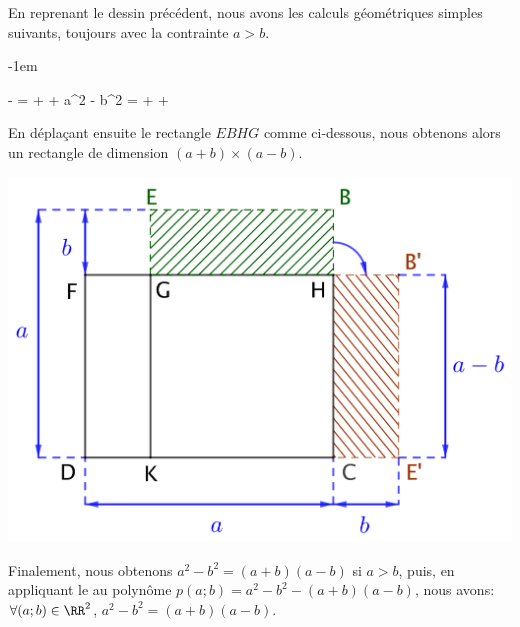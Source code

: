 \begin{example}
	En reprenant le dessin précédent, nous avons les calculs géométriques simples suivants, toujours avec la contrainte $a > b$.

	\smallskip
	\leavevmode\kern-1em%
	\begin{stepcalc}[style=ar*, ope={\iff}]
    	 -  =  +  + 
	\explnext{}
    	a^2 - b^2 =  +  + 
	\end{stepcalc}
	\smallskip

	En déplaçant ensuite le rectangle $EBHG$ comme ci-dessous, nous obtenons alors un rectangle de dimension $(a+b) \times (a-b)$. 

	\begin{center}
		\includegraphics[scale = .7]{a^2-b^2.png}
	\end{center}

	Finalement, nous obtenons $a^2 - b^2 = (a+b)(a-b)$ si $a > b$,
	puis,
	en appliquant le  au polynôme $p(a ; b) = a^2 - b^2 - (a+b)(a-b)$,
	nous avons:
	$\forall (a ; b) \in \RR^2$, $a^2 - b^2 = (a+b)(a-b)$.
\end{example}





